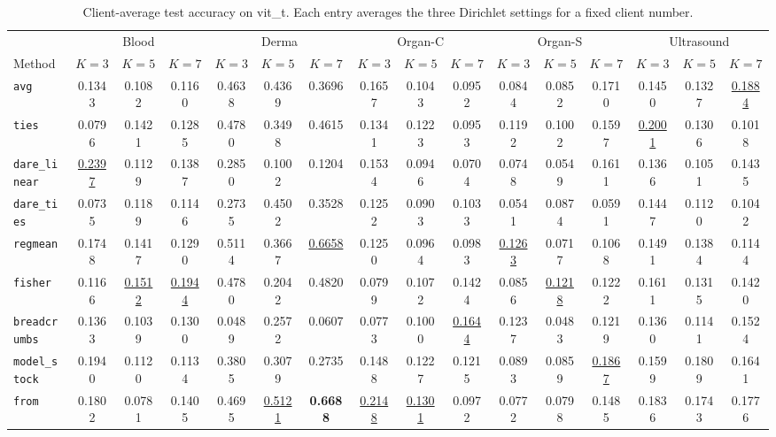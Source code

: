 \begin{table}[t]
\centering
\scriptsize
\setlength{\tabcolsep}{2.6pt}
\caption{Client-average test accuracy on vit\_t. Each entry averages the three Dirichlet settings for a fixed client number.}
\label{tab:client-avg-vit-t}
\begin{tabular}{lccccccccccccccc}
\toprule
& \multicolumn{3}{c}{Blood} & \multicolumn{3}{c}{Derma} & \multicolumn{3}{c}{Organ-C} & \multicolumn{3}{c}{Organ-S} & \multicolumn{3}{c}{Ultrasound} \\
\cmidrule(lr){2-4}\cmidrule(lr){5-7}\cmidrule(lr){8-10}\cmidrule(lr){11-13}\cmidrule(lr){14-16}
Method & $K=3$ & $K=5$ & $K=7$ & $K=3$ & $K=5$ & $K=7$ & $K=3$ & $K=5$ & $K=7$ & $K=3$ & $K=5$ & $K=7$ & $K=3$ & $K=5$ & $K=7$ \\
\midrule
\texttt{avg} & 0.1343 & 0.1082 & 0.1160 & 0.4638 & 0.4369 & 0.3696 & 0.1657 & 0.1043 & 0.0952 & 0.0844 & 0.0852 & 0.1710 & 0.1450 & 0.1327 & \underline{0.1884} \\
\texttt{ties} & 0.0796 & 0.1421 & 0.1285 & 0.4780 & 0.3498 & 0.4615 & 0.1341 & 0.1223 & 0.0953 & 0.1192 & 0.1002 & 0.1597 & \underline{0.2001} & 0.1306 & 0.1018 \\
\texttt{dare\_linear} & \underline{0.2397} & 0.1129 & 0.1387 & 0.2850 & 0.1002 & 0.1204 & 0.1534 & 0.0946 & 0.0704 & 0.0748 & 0.0549 & 0.1611 & 0.1366 & 0.1051 & 0.1435 \\
\texttt{dare\_ties} & 0.0735 & 0.1189 & 0.1146 & 0.2735 & 0.4502 & 0.3528 & 0.1252 & 0.0903 & 0.1033 & 0.0541 & 0.0874 & 0.0591 & 0.1447 & 0.1120 & 0.1042 \\
\texttt{regmean} & 0.1748 & 0.1417 & 0.1290 & 0.5114 & 0.3667 & \underline{0.6658} & 0.1250 & 0.0964 & 0.0983 & \underline{0.1263} & 0.0717 & 0.1068 & 0.1491 & 0.1384 & 0.1144 \\
\texttt{fisher} & 0.1166 & \underline{0.1512} & \underline{0.1944} & 0.4780 & 0.2042 & 0.4820 & 0.0799 & 0.1072 & 0.1424 & 0.0856 & \underline{0.1218} & 0.1222 & 0.1611 & 0.1315 & 0.1420 \\
\texttt{breadcrumbs} & 0.1363 & 0.1039 & 0.1300 & 0.0489 & 0.2572 & 0.0607 & 0.0773 & 0.1000 & \underline{0.1644} & 0.1237 & 0.0483 & 0.1219 & 0.1360 & 0.1141 & 0.1524 \\
\texttt{model\_stock} & 0.1940 & 0.1120 & 0.1134 & 0.3805 & 0.3079 & 0.2735 & 0.1488 & 0.1227 & 0.1215 & 0.0893 & 0.0859 & \underline{0.1867} & 0.1599 & 0.1809 & 0.1641 \\
\texttt{from} & 0.1802 & 0.0781 & 0.1405 & 0.4695 & \underline{0.5121} & \textbf{0.6688} & \underline{0.2148} & \underline{0.1301} & 0.0972 & 0.0772 & 0.0798 & 0.1485 & 0.1836 & 0.1743 & 0.1776 \\

\end{tabular}
\end{table}
